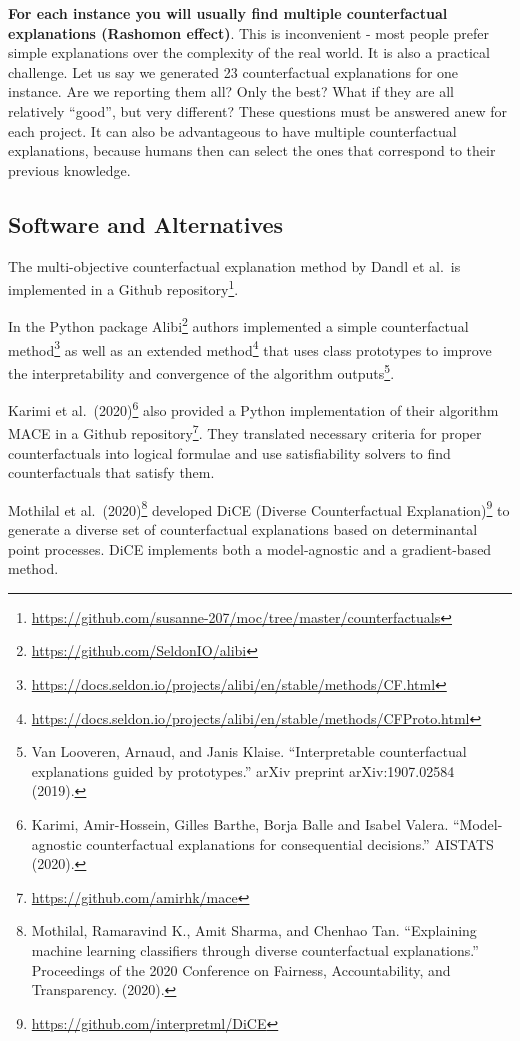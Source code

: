 \documentclass[
  10pt,
]{scrbook}
\renewcommand{\href}[2]{#2\footnote{\url{#1}}}
\begin{document}
\textbf{For each instance you will usually find multiple counterfactual explanations (Rashomon effect)}.
This is inconvenient - most people prefer simple explanations over the complexity of the real world.
It is also a practical challenge.
Let us say we generated 23 counterfactual explanations for one instance.
Are we reporting them all?
Only the best?
What if they are all relatively ``good'', but very different?
These questions must be answered anew for each project.
It can also be advantageous to have multiple counterfactual explanations, because humans then can select the ones that correspond to their previous knowledge.

\hypertarget{example-software}{%
\subsection{Software and Alternatives}\label{example-software}}

The multi-objective counterfactual explanation method by Dandl et al.~is implemented in a \href{https://github.com/susanne-207/moc/tree/master/counterfactuals}{Github repository}.

In the Python package \href{https://github.com/SeldonIO/alibi}{Alibi} authors implemented a \href{https://docs.seldon.io/projects/alibi/en/stable/methods/CF.html}{simple counterfactual method} as well as an \href{https://docs.seldon.io/projects/alibi/en/stable/methods/CFProto.html}{extended method} that uses class prototypes to improve the interpretability and convergence of the algorithm outputs\footnote{Van Looveren, Arnaud, and Janis Klaise. ``Interpretable counterfactual explanations guided by prototypes.'' arXiv preprint arXiv:1907.02584 (2019).}.

Karimi et al.~(2020)\footnote{Karimi, Amir-Hossein, Gilles Barthe, Borja Balle and Isabel Valera. ``Model-agnostic counterfactual explanations for consequential decisions.'' AISTATS (2020).} also provided a Python implementation of their algorithm MACE in a \href{https://github.com/amirhk/mace}{Github repository}.
They translated necessary criteria for proper counterfactuals into logical formulae and use satisfiability solvers to find counterfactuals that satisfy them.

Mothilal et al.~(2020)\footnote{Mothilal, Ramaravind K., Amit Sharma, and Chenhao Tan. ``Explaining machine learning classifiers through diverse counterfactual explanations.'' Proceedings of the 2020 Conference on Fairness, Accountability, and Transparency. (2020).} developed \href{https://github.com/interpretml/DiCE}{DiCE (Diverse Counterfactual Explanation)} to generate a diverse set of counterfactual explanations based on determinantal point processes.
DiCE implements both a model-agnostic and a gradient-based method.
\end{document}
